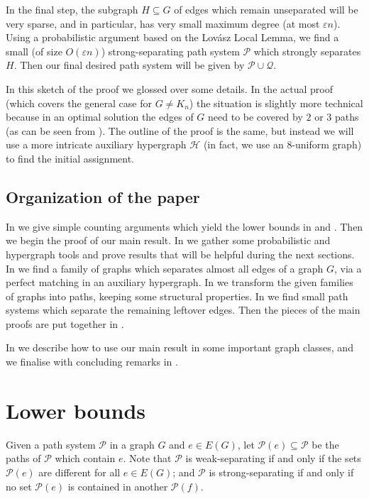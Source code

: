 \documentclass[a4paper, 11pt,reqno]{amsart}
\theoremstyle{plain}
\theoremstyle{definition}
\numberwithin{equation}{section}
\newcommand{\eps}{\varepsilon}
\begin{document}
In the final step, the subgraph $H \subseteq G$ of edges which remain
unseparated will be very sparse, and in particular, has very small
maximum degree (at most $\eps n$).  Using a probabilistic
argument based on the Lovász Local Lemma, we find a small (of size $O(\eps
n)$) strong-separating path system $\mathcal{P}$ which
strongly separates $H$. Then our final desired path
system will be given by $\mathcal{P} \cup \mathcal{Q}$.

In this sketch of the proof we glossed over some details.  In the
actual proof (which covers the general case for $G \neq K_n$) the
situation is slightly more technical because in an optimal solution
the edges of $G$ need to be covered by $2$ or $3$ paths (as can be
seen from ).  The outline of the
proof is the same, but instead we will use a more intricate
auxiliary hypergraph $\mathcal{H}$ (in fact, we use an $8$-uniform
graph) to find the initial assignment.

\subsection{Organization of the paper}

In  we give simple counting arguments which
yield the lower bounds in  and
.
Then we begin the proof of our main result.
In  we gather some probabilistic and hypergraph tools and prove results that will be helpful during the next sections.
In  we find a family of graphs which separates almost all edges of a graph $G$, via a perfect matching in an auxiliary hypergraph.
In  we transform the given families of graphs into paths, keeping some structural properties.
In  we find small path systems which separate the remaining leftover edges.
Then the pieces of the main proofs are put together in .

In  we describe how to use our main result in
some important graph classes, and we finalise with concluding remarks
in .

\section{Lower bounds} \label{section:lowerbounds}

Given a path system $\mathcal{P}$ in a graph $G$ and $e \in E(G)$, let
$\mathcal{P}(e) \subseteq \mathcal{P}$ be the paths of $\mathcal{P}$
which contain $e$.  Note that $\mathcal{P}$ is weak-separating if and
only if the sets $\mathcal{P}(e)$ are different for all $e \in E(G)$;
and $\mathcal{P}$ is strong-separating if and only if no
set $\mathcal{P}(e)$ is contained in another $\mathcal{P}(f)$.
\end{document}
